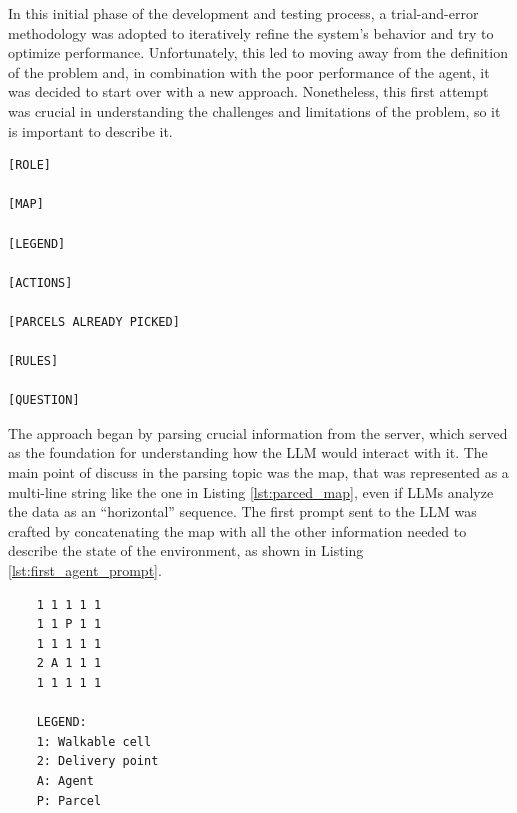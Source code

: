 In this initial phase of the development and testing process, a trial-and-error methodology
was adopted to iteratively refine the system's behavior and try to optimize performance.
Unfortunately, this led to moving away from the definition of the problem and,
in combination with the poor performance of the agent, it was decided to start over
with a new approach. Nonetheless, this first attempt was crucial in understanding
the challenges and limitations of the problem, so it is important to describe it.

\vspace{1mm}
\begin{codewindow}
  [Text]  \begin{lstlisting}
[ROLE]

[MAP]

[LEGEND]

[ACTIONS]

[PARCELS ALREADY PICKED]

[RULES]

[QUESTION]
\end{lstlisting}
\end{codewindow}
\vspace{1mm}

The approach began by parsing crucial information from the server, which served
as the foundation for understanding how the LLM would interact with it. The main
point of discuss in the parsing topic was the map, that was represented as a
multi-line string like the one in Listing \ref{lst:parced_map}, even if LLMs analyze
the data as an ``horizontal'' sequence. The first prompt sent to the LLM was
crafted by concatenating the map with all the other information needed to
describe the state of the environment, as shown in Listing \ref{lst:first_agent_prompt}.

\vspace{1mm}
\begin{codewindow}
  [Text]  \begin{lstlisting}
    1 1 1 1 1
    1 1 P 1 1
    1 1 1 1 1
    2 A 1 1 1
    1 1 1 1 1

    LEGEND:
    1: Walkable cell
    2: Delivery point
    A: Agent
    P: Parcel
\end{lstlisting}
\end{codewindow}
\vspace{1mm}

